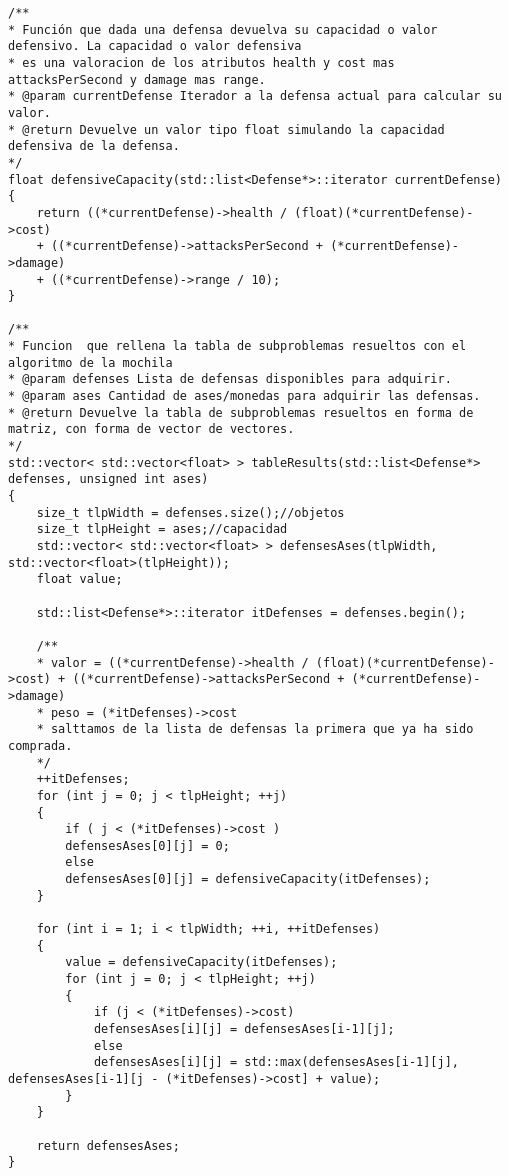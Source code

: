 \begin{lstlisting}
/**
* Función que dada una defensa devuelva su capacidad o valor defensivo. La capacidad o valor defensiva
* es una valoracion de los atributos health y cost mas attacksPerSecond y damage mas range.
* @param currentDefense Iterador a la defensa actual para calcular su valor.
* @return Devuelve un valor tipo float simulando la capacidad defensiva de la defensa.
*/
float defensiveCapacity(std::list<Defense*>::iterator currentDefense)
{
	return ((*currentDefense)->health / (float)(*currentDefense)->cost)
	+ ((*currentDefense)->attacksPerSecond + (*currentDefense)->damage)
	+ ((*currentDefense)->range / 10);
}

/**
* Funcion  que rellena la tabla de subproblemas resueltos con el algoritmo de la mochila
* @param defenses Lista de defensas disponibles para adquirir.
* @param ases Cantidad de ases/monedas para adquirir las defensas.
* @return Devuelve la tabla de subproblemas resueltos en forma de matriz, con forma de vector de vectores.
*/
std::vector< std::vector<float> > tableResults(std::list<Defense*> defenses, unsigned int ases)
{
	size_t tlpWidth = defenses.size();//objetos
	size_t tlpHeight = ases;//capacidad
	std::vector< std::vector<float> > defensesAses(tlpWidth, std::vector<float>(tlpHeight));
	float value;
	
	std::list<Defense*>::iterator itDefenses = defenses.begin();
	
	/**
	* valor = ((*currentDefense)->health / (float)(*currentDefense)->cost) + ((*currentDefense)->attacksPerSecond + (*currentDefense)->damage)
	* peso = (*itDefenses)->cost
	* salttamos de la lista de defensas la primera que ya ha sido comprada.
	*/
	++itDefenses;
	for (int j = 0; j < tlpHeight; ++j)
	{
		if ( j < (*itDefenses)->cost )
		defensesAses[0][j] = 0;
		else
		defensesAses[0][j] = defensiveCapacity(itDefenses);
	}
	
	for (int i = 1; i < tlpWidth; ++i, ++itDefenses)
	{
		value = defensiveCapacity(itDefenses);
		for (int j = 0; j < tlpHeight; ++j)
		{
			if (j < (*itDefenses)->cost)
			defensesAses[i][j] = defensesAses[i-1][j];
			else
			defensesAses[i][j] = std::max(defensesAses[i-1][j], defensesAses[i-1][j - (*itDefenses)->cost] + value);
		}
	}

	return defensesAses;
}
\end{lstlisting}
